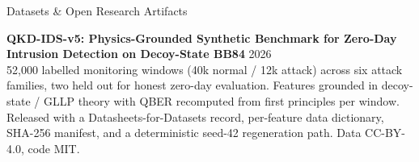 \documentclass{resume} %
\begin{document}
\begin{rSection}{Datasets \& Open Research Artifacts} \itemsep -3pt

{\textbf{QKD-IDS-v5: Physics-Grounded Synthetic Benchmark for Zero-Day Intrusion Detection on Decoy-State BB84}} \hfill 2026 \\
52,000 labelled monitoring windows (40k normal / 12k attack) across six attack families, two held out for honest zero-day evaluation. Features grounded in decoy-state / GLLP theory with QBER recomputed from first principles per window. Released with a Datasheets-for-Datasets record, per-feature data dictionary, SHA-256 manifest, and a deterministic seed-42 regeneration path. Data CC-BY-4.0, code MIT.

\end{rSection}





 
\end{document}
